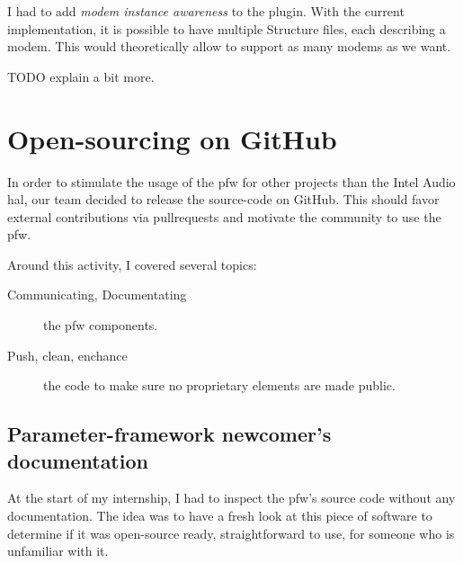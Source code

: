 I had to add \emph{modem instance awareness} to the plugin. With the current implementation, it
is possible to have multiple Structure files, each describing a modem. This would theoretically allow
to support as many modems as we want.

TODO explain a bit more.

\section{Open-sourcing on GitHub}
In order to stimulate the usage of the \gls{pfw} for other projects than the Intel Audio \gls{hal},
our team decided to release the source-code on \gls{GitHub}.
This should favor external contributions via \gls{pullrequests} and motivate
the community to use the \gls{pfw}.

Around this activity, I covered several topics:
\begin{description}
    \item[Communicating, Documentating] the \gls{pfw} components.
    \item[Push, clean, enchance] the code to make sure no proprietary
        elements are made public.
\end{description}

\subsection{Parameter-framework newcomer's documentation}\label{sec:tutorials}

At the start of my internship, I had to inspect the \gls{pfw}'s
source code without any documentation. The idea was to have a fresh look at
this piece of software to determine if it was open-source ready, straightforward
to use, for someone who is unfamiliar with it.

